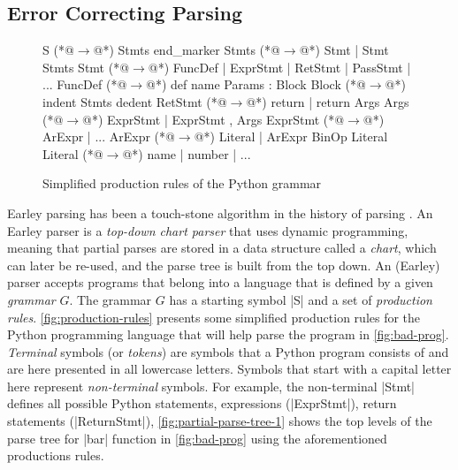 \subsection{Error Correcting Parsing}
\label{sec:overview:ec-parsing}

\begin{figure}[t]
\begin{rules}
S        (*@$\rightarrow$@*) Stmts end_marker
Stmts    (*@$\rightarrow$@*) Stmt \n | Stmt \n Stmts
Stmt     (*@$\rightarrow$@*) FuncDef | ExprStmt | RetStmt | PassStmt | ...
FuncDef  (*@$\rightarrow$@*) def name Params : Block
Block    (*@$\rightarrow$@*) \n indent Stmts dedent
RetStmt  (*@$\rightarrow$@*) return | return Args
Args     (*@$\rightarrow$@*) ExprStmt | ExprStmt , Args
ExprStmt (*@$\rightarrow$@*) ArExpr | ...
ArExpr   (*@$\rightarrow$@*) Literal | ArExpr BinOp Literal
Literal  (*@$\rightarrow$@*) name | number | ...
\end{rules}
\caption{Simplified production rules of the Python grammar}
\label{fig:production-rules}
\end{figure}

 Earley parsing has been a touch-stone
algorithm in the history of parsing \citep{Earley_1970}. An Earley parser is a
\emph{top-down chart parser} that uses dynamic programming, meaning that partial
parses are stored in a data structure called a \emph{chart}, which can later be
re-used, and the parse tree is built from the top down. An (Earley) parser
accepts programs that belong into a language that is defined by a given
\emph{grammar} $G$. The grammar $G$ has a starting symbol |S| and a set of
\emph{production rules}. \autoref{fig:production-rules} presents some simplified
production rules for the Python programming language that will help parse the
program in \autoref{fig:bad-prog}. \emph{Terminal} symbols (or \emph{tokens})
are symbols that a Python program consists of and are here presented in all
lowercase letters. Symbols that start with a capital letter here represent
\emph{non-terminal} symbols. For example, the non-terminal |Stmt| defines all
possible Python statements, \ie expressions (|ExprStmt|), return statements
(|ReturnStmt|), \etc \autoref{fig:partial-parse-tree-1} shows the top levels of
the parse tree for |bar| function in \autoref{fig:bad-prog} using the
aforementioned productions rules.

